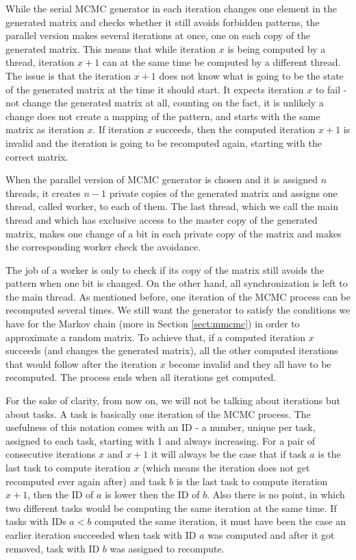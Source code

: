 While the serial MCMC generator in each iteration changes one element in the generated matrix and checks whether it still avoids forbidden patterns, the parallel version makes several iterations at once, one on each copy of the generated matrix. This means that while iteration $x$ is being computed by a thread, iteration $x+1$ can at the same time be computed by a different thread. The issue is that the iteration $x+1$ does not know what is going to be the state of the generated matrix at the time it should start. It expects iteration $x$ to fail - not change the generated matrix at all, counting on the fact, it is unlikely a change does not create a mapping of the pattern, and starts with the same matrix as iteration $x$. If iteration $x$ succeeds, then the computed iteration $x+1$ is invalid and the iteration is going to be recomputed again, starting with the correct matrix.

When the parallel version of MCMC generator is chosen and it is assigned $n$ threads, it creates $n-1$ private copies of the generated matrix and assigns one thread, called worker, to each of them. The last thread, which we call the main thread and which has exclusive access to the master copy of the generated matrix, makes one change of a bit in each private copy of the matrix and makes the corresponding worker check the avoidance.

The job of a worker is only to check if its copy of the matrix still avoids the pattern when one bit is changed. On the other hand, all synchronization is left to the main thread. As mentioned before, one iteration of the MCMC process can be recomputed several times. We still want the generator to satisfy the conditions we have for the Markov chain (more in Section \ref{sect:mmcmc}) in order to approximate a random matrix. To achieve that, if a computed iteration $x$ succeeds (and changes the generated matrix), all the other computed iterations that would follow after the iteration $x$ become invalid and they all have to be recomputed. The process ends when all iterations get computed.

For the sake of clarity, from now on, we will not be talking about iterations but about tasks. A task is basically one iteration of the MCMC process. The usefulness of this notation comes with an ID - a number, unique per task, assigned to each task, starting with 1 and always increasing. For a pair of consecutive iterations $x$ and $x+1$ it will always be the case that if task $a$ is the last task to compute iteration $x$ (which means the iteration does not get recomputed ever again after) and task $b$ is the last task to compute iteration $x+1$, then the ID of $a$ is lower then the ID of $b$. Also there is no point, in which two different tasks would be computing the same iteration at the same time. If tasks with IDs $a<b$ computed the same iteration, it must have been the case an earlier iteration succeeded when task with ID $a$ was computed and after it got removed, task with ID $b$ was assigned to recompute.

